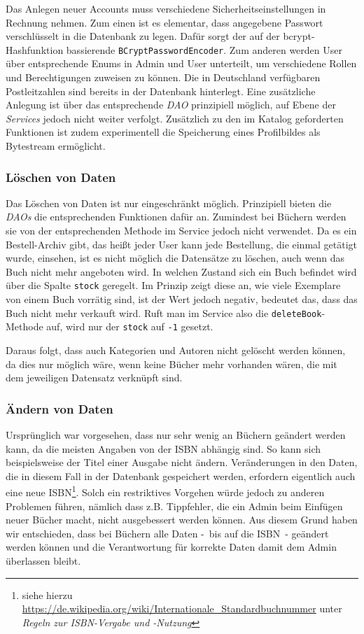 		Das Anlegen neuer Accounts muss verschiedene Sicherheitseinstellungen in Rechnung nehmen. Zum einen ist es elementar, dass angegebene Passwort verschlüsselt in die Datenbank zu legen. Dafür sorgt der auf der bcrypt-Hashfunktion bassierende \texttt{BCrypt\-Password\-Encoder}. Zum anderen werden User über entsprechende Enums in Admin und User unterteilt, um verschiedene Rollen und Berechtigungen zuweisen zu können. Die in Deutschland verfügbaren Postleitzahlen sind bereits in der Datenbank hinterlegt. Eine zusätzliche Anlegung ist über das entsprechende \textit{DAO} prinzipiell möglich, auf Ebene der \textit{Services} jedoch nicht weiter verfolgt. Zusätzlich zu den im Katalog geforderten Funktionen ist zudem experimentell die Speicherung eines Profilbildes als Bytestream ermöglicht.
		
		\subsubsection{Löschen von Daten}\label{umsetzung:DB:Loeschen}
		Das Löschen von Daten ist nur eingeschränkt möglich. Prinzipiell bieten die \textit{DAOs} die entsprechenden Funktionen dafür an. Zumindest bei Büchern werden sie von der entsprechenden Methode im Service jedoch nicht verwendet. Da es ein Bestell-Archiv gibt, das heißt jeder User kann jede Bestellung, die einmal getätigt wurde, einsehen, ist es nicht möglich die Datensätze zu löschen, auch wenn das Buch nicht mehr angeboten wird. In welchen Zustand sich ein Buch befindet wird über die Spalte \texttt{stock} geregelt. Im Prinzip zeigt diese an, wie viele Exemplare von einem Buch vorrätig sind, ist der Wert jedoch negativ, bedeutet das, dass das Buch nicht mehr verkauft wird. Ruft man im Service also die \texttt{deleteBook}-Methode auf, wird nur der \texttt{stock} auf \texttt{-1} gesetzt.
		
		Daraus folgt, dass auch Kategorien und Autoren nicht gelöscht werden können, da dies nur möglich wäre, wenn keine Bücher mehr vorhanden wären, die mit dem jeweiligen Datensatz verknüpft sind.
		
		\subsubsection{Ändern von Daten}\label{umsetzung:DB:Aendern}
		Ursprünglich war vorgesehen, dass nur sehr wenig an Büchern geändert werden kann, da die meisten Angaben von der ISBN abhängig sind. So kann sich beispielsweise der Titel einer Ausgabe nicht ändern. Veränderungen in den Daten, die in diesem Fall in der Datenbank gespeichert werden, erfordern eigentlich auch eine neue ISBN\footnote{siehe hierzu \url{https://de.wikipedia.org/wiki/Internationale\_Standardbuchnummer} unter \textit{Regeln zur ISBN-Vergabe und -Nutzung}}. Solch ein restriktives Vorgehen würde jedoch zu anderen Problemen führen, nämlich dass z.B. Tippfehler, die ein Admin beim Einfügen neuer Bücher macht, nicht ausgebessert werden können. Aus diesem Grund haben wir entschieden, dass bei Büchern alle Daten -~bis auf die ISBN~- geändert werden können und die Verantwortung für korrekte Daten damit dem Admin überlassen bleibt.
	
